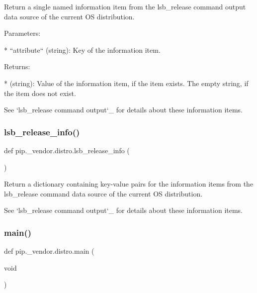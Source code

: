 \begin{DoxyVerb}Return a single named information item from the lsb_release command output
data source of the current OS distribution.

Parameters:

* ``attribute`` (string): Key of the information item.

Returns:

* (string): Value of the information item, if the item exists.
  The empty string, if the item does not exist.

See `lsb_release command output`_ for details about these information
items.
\end{DoxyVerb}
 \mbox{\label{namespacepip_1_1__vendor_1_1distro_a9fd2e7c31fd954f50caf8bb1cf7e8ee5}} 
\subsubsection{\texorpdfstring{lsb\+\_\+release\+\_\+info()}{lsb\_release\_info()}}
{\footnotesize\ttfamily def pip.\+\_\+vendor.\+distro.\+lsb\+\_\+release\+\_\+info (\begin{DoxyParamCaption}{ }\end{DoxyParamCaption})}

\begin{DoxyVerb}Return a dictionary containing key-value pairs for the information items
from the lsb_release command data source of the current OS distribution.

See `lsb_release command output`_ for details about these information
items.
\end{DoxyVerb}
 \mbox{\label{namespacepip_1_1__vendor_1_1distro_a404765c670d873a51a423c0105907ad2}} 
\subsubsection{\texorpdfstring{main()}{main()}}
{\footnotesize\ttfamily def pip.\+\_\+vendor.\+distro.\+main (\begin{DoxyParamCaption}\item[{void}]{ }\end{DoxyParamCaption})}

